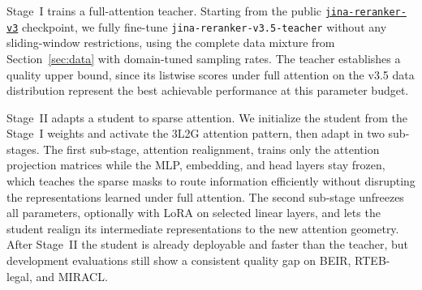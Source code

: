 \documentclass{article}
\newcommand{\jrrvthree}{\href{https://huggingface.co/jinaai/jina-reranker-v3}{\texttt{jina-reranker-v3}}}
\newcommand{\jrrvthreefiveteacher}{\texttt{jina-reranker-v3.5-teacher}}
\begin{document}
Stage~I trains a full-attention teacher. Starting from the public \jrrvthree{} checkpoint, we fully fine-tune \jrrvthreefiveteacher{} without any sliding-window restrictions, using the complete data mixture from Section~\ref{sec:data} with domain-tuned sampling rates. The teacher establishes a quality upper bound, since its listwise scores under full attention on the v3.5 data distribution represent the best achievable performance at this parameter budget.

Stage~II adapts a student to sparse attention. We initialize the student from the Stage~I weights and activate the 3L2G attention pattern, then adapt in two sub-stages. The first sub-stage, attention realignment, trains only the attention projection matrices while the MLP, embedding, and head layers stay frozen, which teaches the sparse masks to route information efficiently without disrupting the representations learned under full attention. The second sub-stage unfreezes all parameters, optionally with LoRA on selected linear layers, and lets the student realign its intermediate representations to the new attention geometry. After Stage~II the student is already deployable and faster than the teacher, but development evaluations still show a consistent quality gap on BEIR, RTEB-legal, and MIRACL.
\end{document}
